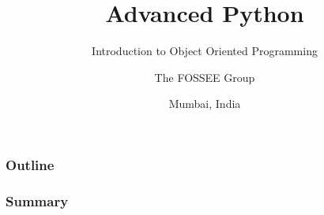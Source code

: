 \documentclass[14pt,compress,aspectratio=169]{beamer}
\title[Introduction to OOP]{Advanced Python}
\subtitle{Introduction to Object Oriented Programming }
\author[FOSSEE] {The FOSSEE Group}
\institute[IIT Bombay] {Department of Aerospace Engineering\\IIT Bombay}
\date[] {Mumbai, India}
\begin{document}
\begin{frame}
  \titlepage
\end{frame}

\begin{frame}
  \frametitle{Outline}
  \begin{itemize}
  \end{itemize}
\end{frame}



\begin{frame}
  \frametitle{Summary}
  \begin{itemize}
  \end{itemize}
\end{frame}
\end{document}

